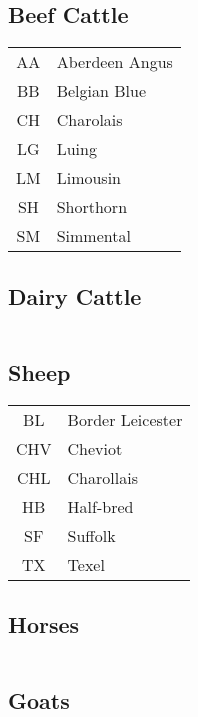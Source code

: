 \documentclass[a4paper,11pt]{report}
\begin{document}
	\subsection*{Beef Cattle}
	\begin{tabular}{cl}
		AA & Aberdeen Angus \\
		BB & Belgian Blue \\
		CH & Charolais \\
		LG & Luing \\
		LM & Limousin \\
		SH & Shorthorn\\
		SM & Simmental \\
	\end{tabular}

	\subsection*{Dairy Cattle}
	\begin{tabular}{cl}
		
	\end{tabular}
	
	\subsection*{Sheep}
	\begin{tabular}{cl}
		BL & Border Leicester \\
		CHV & Cheviot \\
		CHL & Charollais \\
		HB & Half-bred \\
		SF & Suffolk \\
		TX & Texel \\
	\end{tabular}

	\subsection*{Horses}
	\begin{tabular}{cl}
		
	\end{tabular}

	\subsection*{Goats}
	\begin{tabular}{cl}
		
	\end{tabular}
\end{document}
